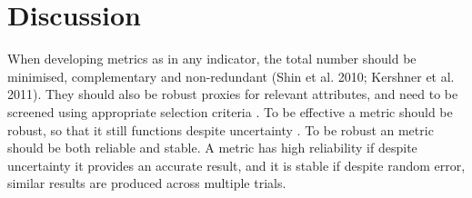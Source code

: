 \newpage
\section*{Discussion}


When developing metrics as in any indicator, the total number should be minimised, complementary and non-redundant (Shin et al. 2010; Kershner et al. 2011). They should also be robust proxies for relevant attributes, and need to be screened using appropriate selection criteria \cite{kell2020roc}. To be effective a metric should be robust, so that it still functions despite uncertainty \parencite{radatz1990ieee, zhou1996robust}. To be robust an metric should be both reliable and stable. A metric has high reliability if despite uncertainty it provides an accurate result, and it is stable if despite random error, similar results are produced across multiple trials. 

